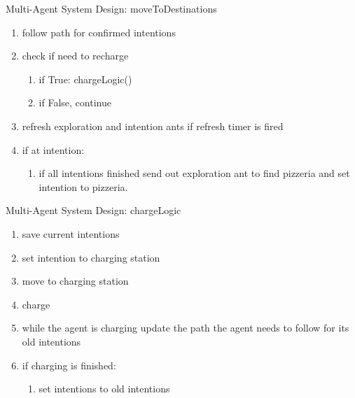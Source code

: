 \begin{frame}{Multi-Agent System Design: moveToDestinations}
	\begin{enumerate}
		\item follow path for confirmed intentions
		\item check if need to recharge
		\begin{enumerate}
			\item if True: chargeLogic()
			\item if False, continue
		\end{enumerate}
		\item refresh exploration and intention ants if refresh timer is fired
		\item if at intention:
		\begin{enumerate}
			\item if all intentions finished send out exploration ant to find pizzeria and set intention to pizzeria.
		\end{enumerate}
	\end{enumerate}
\end{frame}


\begin{frame}{Multi-Agent System Design: chargeLogic}
	\begin{enumerate}
		\item save current intentions
		\item set intention to charging station
		\item move to charging station
		\item charge
		\item while the agent is charging update the path the agent needs to follow for its old intentions
		\item if charging is finished:
		\begin{enumerate}
			\item set intentions to old intentions
		\end{enumerate}
	\end{enumerate}
\end{frame}

